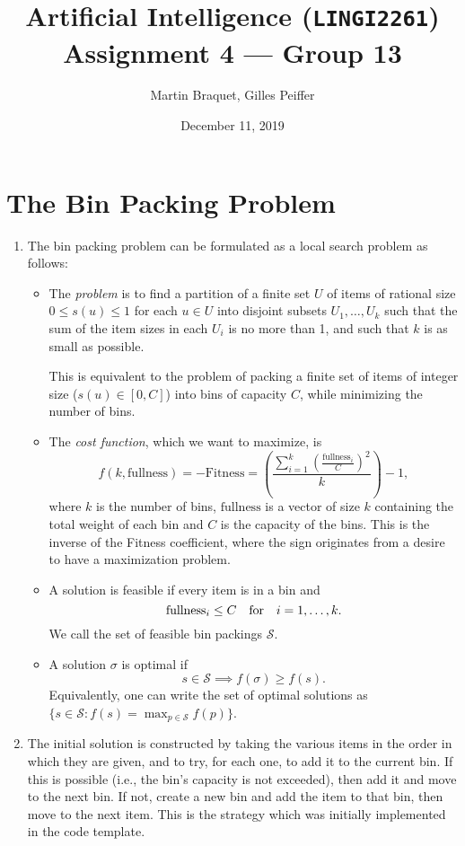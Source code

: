 \documentclass[journal,onecolumn]{IEEEtran}
\title{Artificial Intelligence (\texttt{LINGI2261}) \\ Assignment 4 --- Group 13}
\author{Martin Braquet, Gilles Peiffer}
\date{December 11, 2019}
\begin{document}
\maketitle

\section{The Bin Packing Problem}
\begin{enumerate}
	\item The bin packing problem can be formulated as a local search problem as follows:
	\begin{itemize}
		\item The \emph{problem} is to find a partition of a finite set \(U\) of items of rational size \(0 \le s(u) \le 1\) for each \(u \in U\) into disjoint subsets \(U_1, \ldots, U_k\) such that the sum of the item sizes in each \(U_i\) is no more than 1, and such that \(k\) is as small as possible.
		
		This is equivalent to the problem of packing a finite set of items of integer size (\(s(u) \in [0, C]\)) into bins of capacity \(C\), while minimizing the number of bins.
		\item The \emph{cost function}, which we want to maximize, is
		\[
		f(k, \bm{\mathrm{fullness}}) = -\mathrm{Fitness} =  \left(\frac{\sum_{i=1}^{k} \left(\frac{\mathrm{fullness}_i}{C}\right)^2}{k}\right) - 1,
		\]
		where \(k\) is the number of bins, \(\bm{\mathrm{fullness}}\) is a vector of size \(k\) containing the total weight of each bin and \(C\) is the capacity of the bins.
		This is the inverse of the Fitness coefficient, where the sign originates from a desire to have a maximization problem.
		\item A solution is feasible if every item is in a bin and
		\[
		\mathrm{fullness}_i \le C \quad \textnormal{for} \quad i = 1, \ldots, k.
		\]
		We call the set of feasible bin packings \(\mathcal{S}\).
		\item A solution \(\sigma\) is optimal if
		\[
		s \in \mathcal{S} \implies f(\sigma) \ge f(s).
		\]
		Equivalently, one can write the set of optimal solutions as \(\{s \in \mathcal{S} : f(s) = \max_{p \in \mathcal{S}} f(p)\}\).
	\end{itemize}
	\item The initial solution is constructed by taking the various items in the order in which they are given, and to try, for each one, to add it to the current bin.
	If this is possible (i.e., the bin's capacity is not exceeded), then add it and move to the next bin.
	If not, create a new bin and add the item to that bin, then move to the next item.
	This is the strategy which was initially implemented in the code template.
	

\end{enumerate}
\end{document}
